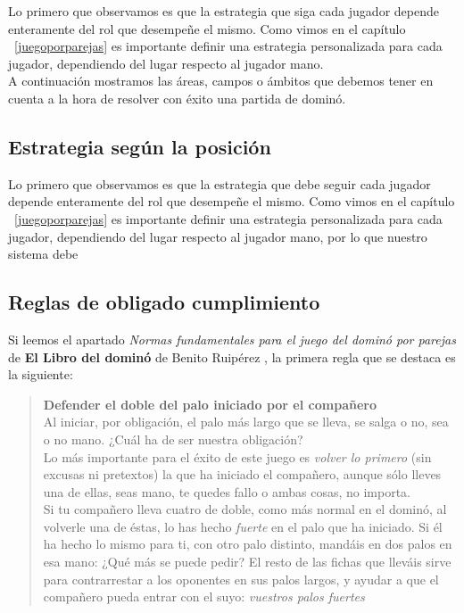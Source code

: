 Lo primero que observamos es que la estrategia que siga cada jugador depende enteramente del rol que desempeñe el mismo.
Como vimos en el capítulo ~\ref{juegoporparejas} es importante definir una estrategia personalizada para cada jugador,
dependiendo del lugar respecto al jugador mano. \\

A continuación mostramos las áreas, campos o ámbitos que debemos tener en cuenta a la hora de resolver con éxito
una partida de dominó.

\subsection{Estrategia según la posición}

Lo primero que observamos es que la estrategia que debe seguir cada jugador depende enteramente del rol que desempeñe el mismo.
Como vimos en el capítulo ~\ref{juegoporparejas} es importante definir una estrategia personalizada para cada jugador,
dependiendo del lugar respecto al jugador mano, por lo que nuestro sistema debe 

\subsection{Reglas de obligado cumplimiento}

Si leemos el apartado \emph{Normas fundamentales para el juego del dominó por parejas} de \textbf{El Libro del dominó} de
Benito Ruipérez \cite{mora90}, la primera regla que se destaca es la siguiente:

\begin{quote}
    \textbf{Defender el doble del palo iniciado por el compañero} \\
    Al iniciar, por obligación, el palo más largo que se lleva, se salga o no, sea o no mano. ¿Cuál ha de ser nuestra
    obligación?\\
    Lo más importante para el éxito de este juego es \emph{volver lo primero} (sin excusas ni pretextos) la que ha iniciado
    el compañero, aunque sólo lleves una de ellas, seas mano, te quedes fallo o ambas cosas, no importa.\\
    Si tu compañero lleva cuatro de doble, como más normal en el dominó, al volverle una de éstas, lo has hecho \emph{fuerte}
    en el palo que ha iniciado. Si él ha hecho lo mismo para ti, con otro palo distinto, mandáis en dos palos en
    esa mano: ¿Qué más se puede pedir? El resto de las fichas que lleváis sirve para contrarrestar a los oponentes en sus
    palos largos, y ayudar a que el compañero pueda entrar con el suyo: \emph{vuestros palos fuertes}
\end{quote}

